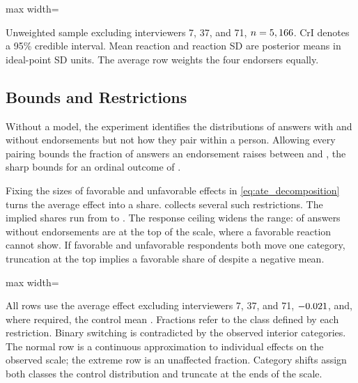 \documentclass[11pt,letterpaper]{article}
\newcommand{\TableStyle}{\normalsize\setlength{\tabcolsep}{6pt}\renewcommand{\arraystretch}{1}}
\newcommand{\tablenote}[1]{\par\smallskip\begin{minipage}{\linewidth}\footnotesize #1\end{minipage}}
\begin{document}
\begin{table}[htbp]
\centering\TableStyle
\caption{Positive latent reactions under the baseline measurement model, excluding the three interviewers}
\label{tab:endorse_results}
\begin{adjustbox}{max width=\linewidth}

\end{adjustbox}
\tablenote{Unweighted sample excluding interviewers 7, 37, and 71, $n=5,166$. CrI denotes a 95\% credible interval. Mean reaction and reaction SD are posterior means in ideal-point SD units. The average row weights the four endorsers equally.}
\end{table}

\subsection{Bounds and Restrictions}

Without a model, the experiment identifies the distributions of answers with and without endorsements but not how they pair within a person. Allowing every pairing bounds the fraction of answers an endorsement raises between \LowerBound{} and \UpperBound{}, the sharp bounds for an ordinal outcome of \citet{lu2018ordinal}.

Fixing the sizes of favorable and unfavorable effects in \cref{eq:ate_decomposition} turns the average effect into a share.  collects several such restrictions. The implied shares run from \SmallSymmetricShare{} to \ExtremeShare{}. The response ceiling widens the range: \CeilingShare{} of answers without endorsements are at the top of the scale, where a favorable reaction cannot show. If favorable and unfavorable respondents both move one category, truncation at the top implies a favorable share of \DiscreteOneShare{} despite a negative mean.

\begin{table}[htbp]
\centering\TableStyle
\caption{Favorable shares implied by restrictions on effect sizes}
\label{tab:method_comparison}
\begin{adjustbox}{max width=\linewidth}

\end{adjustbox}
\tablenote{All rows use the average effect excluding interviewers 7, 37, and 71, $-0.021{}$, and, where required, the control mean \BaselineMean{}. Fractions refer to the class defined by each restriction. Binary switching is contradicted by the observed interior categories. The normal row is a continuous approximation to individual effects on the observed scale; the extreme row is an unaffected fraction. Category shifts assign both classes the control distribution and truncate at the ends of the scale.}
\end{table}
\end{document}
